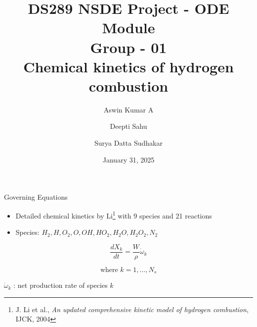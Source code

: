 \documentclass{beamer}
\title{DS289 NSDE Project - ODE Module \\
        Group - 01 \\
        Chemical kinetics of hydrogen combustion }
\author{Aswin Kumar A \and 
        Deepti Sahu \and
        Surya Datta Sudhakar}
\institute{CDS, Indian Institute of Science}
\date{January 31, 2025}
\begin{document}
\begin{frame}
\maketitle
\end{frame}


\begin{frame}{Governing Equations}
\begin{itemize}
    \item Detailed chemical kinetics by Li\footnote{J. Li et al., 
    \textit{An updated comprehensive kinetic model of hydrogen combustion}, 
    IJCK, 2004} 
    with 9 species and 21 reactions
    \item Species: $ H_2, H, O_2, O, OH, HO_2, H_2O, H_2O_2, N_2 $
\end{itemize}

\begin{tcolorbox}[width=0.5\linewidth,center,colback=blue!15!white]
\begin{equation*}
    \dfrac{d X_k}{dt} = \dfrac{W}{\rho} \dot{\omega}_k
\end{equation*}
\end{tcolorbox}

\begin{equation*}
    \text{where } k=1, \ldots, N_s
\end{equation*}

\vspace*{-4mm}
\begin{center}
    $ \dot{\omega}_k $ : net production rate of species $ k $
\end{center}


\end{frame}

\end{document}
